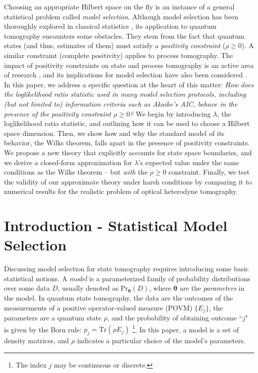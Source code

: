 \documentclass[aps,pra, twocolumn]{revtex4-1}
\newcommand{\bs}[1]{\boldsymbol{#1}}
\begin{document}
Choosing an appropriate Hilbert space on the fly is an instance of a general statistical problem called \emph{model selection}.  Although model selection has been thoroughly explored in classical statistics \cite{Burnham2004}, its application to quantum tomography encounters some obstacles.  They stem from the fact that quantum states (and thus, estimates of them) must satisfy a \emph{positivity constraint} ($\rho\geq0$).  A similar constraint (complete positivity) applies to process tomography.  The impact of positivity constraints on state and process tomography is an active area of research \cite{Candes2006, Flammia2012a, Suess2016, Carpentier2015}, and its implications for model selection have also been considered \cite{Schwarz2013a, Guta2012a, VanEnk2013a, Langford2013, Yin2011, Moroder2013, Knips2015}.  In this paper, we address a specific question at the heart of this matter:  \emph{How does the loglikelihood ratio statistic used in many model selection protocols, including (but not limited to) information criteria such as Akaike's AIC, behave in the presence of the positivity constraint $\rho\geq0$?}  We begin by introducing $\lambda$, the loglikelihood ratio statistic, and outlining how it can be used to choose a Hilbert space dimension.  Then, we show how and why the standard model of its behavior, the Wilks theorem, falls apart in the presence of positivity constraints.  We propose a new theory that explicitly accounts for state space boundaries, and we derive a closed-form approximation for $\lambda$'s expected value under the same conditions as the Wilks theorem -- but \emph{with} the $\rho\geq0$ constraint.  Finally, we test the validity of our approximate theory under harsh conditions by comparing it to numerical results for the realistic problem of optical heterodyne tomography.


\section{Introduction - Statistical Model Selection}

Discussing model selection for state tomography requires introducing some basic statistical notions.  A \emph{model} is a parameterized family of probability distributions over some data $D$, usually denoted as $\mathrm{Pr}_{\bs{\theta}}(D)$, where $\bs{\theta}$ are the \emph{parameters} in the model. In quantum state tomography, the data are the outcomes of the measurements of a positive operator-valued measure (POVM) $\{E_{j}\}$, the parameters are a quantum state $\rho$, and the probability of obtaining outcome ``$j$" is given by the Born rule: $p_{j} = \mathrm{Tr}(\rho E_{j})$ \footnote{The index $j$ may be continuous or discrete.}. In this paper, a model is a set of density matrices, and $\rho$ indicates a particular choice of the model's parameters.
\end{document}
